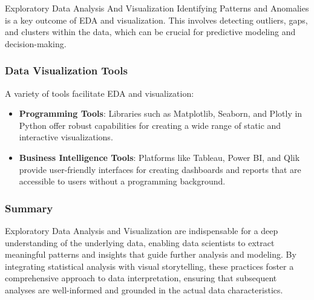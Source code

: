 \begin{notes}{Exploratory Data Analysis And Visualization}
    Identifying Patterns and Anomalies is a key outcome of EDA and visualization. This involves detecting outliers, gaps, and clusters within the data, which can be crucial for predictive modeling and decision-making.
    
    \subsubsection*{Data Visualization Tools}
    
    A variety of tools facilitate EDA and visualization:
    \begin{itemize}
        \item \textbf{Programming Tools}: Libraries such as Matplotlib, Seaborn, and Plotly in Python offer robust capabilities for creating a wide range of static and interactive visualizations.
        \item \textbf{Business Intelligence Tools}: Platforms like Tableau, Power BI, and Qlik provide user-friendly interfaces for creating dashboards and reports that are accessible to users without a programming background.
    \end{itemize}
    
    \subsubsection*{Summary}
    
    Exploratory Data Analysis and Visualization are indispensable for a deep understanding of the underlying data, enabling data scientists to extract meaningful patterns and insights that guide further 
    analysis and modeling. By integrating statistical analysis with visual storytelling, these practices foster a comprehensive approach to data interpretation, ensuring that subsequent analyses are 
    well-informed and grounded in the actual data characteristics.    
\end{notes}